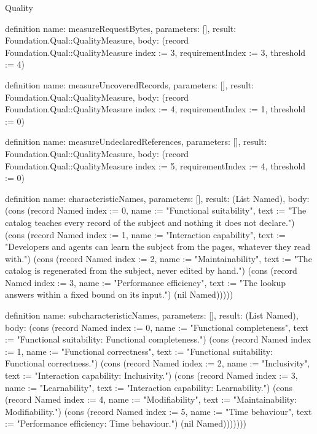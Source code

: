 \begin{lexlean}{Quality}
\begin{semanticmodule}
definition{
  name: measureRequestBytes,
  parameters: [],
  result: Foundation.Qual::QualityMeasure,
  body: (record Foundation.Qual::QualityMeasure {index := 3, requirementIndex := 3, threshold := 4})
}

definition{
  name: measureUncoveredRecords,
  parameters: [],
  result: Foundation.Qual::QualityMeasure,
  body: (record Foundation.Qual::QualityMeasure {index := 4, requirementIndex := 1, threshold := 0})
}

definition{
  name: measureUndeclaredReferences,
  parameters: [],
  result: Foundation.Qual::QualityMeasure,
  body: (record Foundation.Qual::QualityMeasure {index := 5, requirementIndex := 4, threshold := 0})
}

definition{
  name: characteristicNames,
  parameters: [],
  result: (List Named),
  body: (cons (record Named {index := 0, name := "Functional suitability", text := "The catalog teaches every record of the subject and nothing it does not declare."}) (cons (record Named {index := 1, name := "Interaction capability", text := "Developers and agents can learn the subject from the pages, whatever they read with."}) (cons (record Named {index := 2, name := "Maintainability", text := "The catalog is regenerated from the subject, never edited by hand."}) (cons (record Named {index := 3, name := "Performance efficiency", text := "The lookup answers within a fixed bound on its input."}) (nil Named)))))
}

definition{
  name: subcharacteristicNames,
  parameters: [],
  result: (List Named),
  body: (cons (record Named {index := 0, name := "Functional completeness", text := "Functional suitability: Functional completeness."}) (cons (record Named {index := 1, name := "Functional correctness", text := "Functional suitability: Functional correctness."}) (cons (record Named {index := 2, name := "Inclusivity", text := "Interaction capability: Inclusivity."}) (cons (record Named {index := 3, name := "Learnability", text := "Interaction capability: Learnability."}) (cons (record Named {index := 4, name := "Modifiability", text := "Maintainability: Modifiability."}) (cons (record Named {index := 5, name := "Time behaviour", text := "Performance efficiency: Time behaviour."}) (nil Named)))))))
}


\end{semanticmodule}
\end{lexlean}
